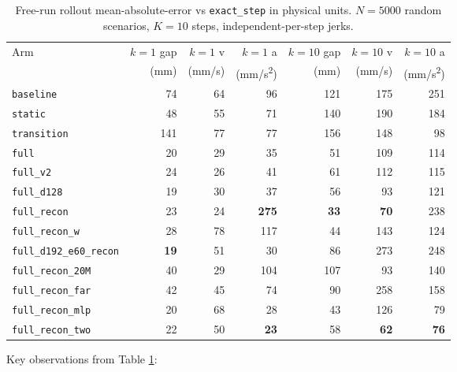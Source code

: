 \documentclass[11pt,a4paper]{article}
\begin{document}
\begin{table}[h]
\centering
\small
\caption{Free-run rollout mean-absolute-error vs \texttt{exact\_step}
in physical units. $N{=}5000$ random scenarios, $K{=}10$ steps,
independent-per-step jerks.}
\label{tab:aggregate}
\setlength{\tabcolsep}{4pt}
\begin{tabular}{lrrrrrr}
\toprule
Arm & $k{=}1$ gap & $k{=}1$ v & $k{=}1$ a & $k{=}10$ gap & $k{=}10$ v & $k{=}10$ a \\
    & (mm) & (mm/s) & (mm/s\textsuperscript{2}) & (mm) & (mm/s) & (mm/s\textsuperscript{2}) \\
\midrule
\texttt{baseline}              & 74 & 64 & 96  & 121 & 175 & 251 \\
\texttt{static}                & 48 & 55 & 71  & 140 & 190 & 184 \\
\texttt{transition}            & 141 & 77 & 77 & 156 & 148 & 98 \\
\texttt{full}                  & 20 & 29 & 35  & 51  & 109 & 114 \\
\texttt{full\_v2}              & 24 & 26 & 41  & 61  & 112 & 115 \\
\texttt{full\_d128}            & 19 & 30 & 37  & 56  &  93 & 121 \\
\texttt{full\_recon}           & 23 & 24 & \textbf{275} & \textbf{33}  & \textbf{70}  & 238 \\
\texttt{full\_recon\_w}        & 28 & 78 & 117 & 44  & 143 & 124 \\
\texttt{full\_d192\_e60\_recon}& \textbf{19} & 51 & 30 & 86  & 273 & 248 \\
\texttt{full\_recon\_20M}      & 40 & 29 & 104 & 107 & 93  & 140 \\
\texttt{full\_recon\_far}      & 42 & 45 & 74  & 90  & 258 & 158 \\
\texttt{full\_recon\_mlp}      & 20 & 68 & 28  & 43  & 126 & 79  \\
\texttt{full\_recon\_two}      & 22 & 50 & \textbf{23}  & 58  & \textbf{62}  & \textbf{76}  \\
\bottomrule
\end{tabular}
\end{table}

Key observations from Table \ref{tab:aggregate}:
\end{document}
